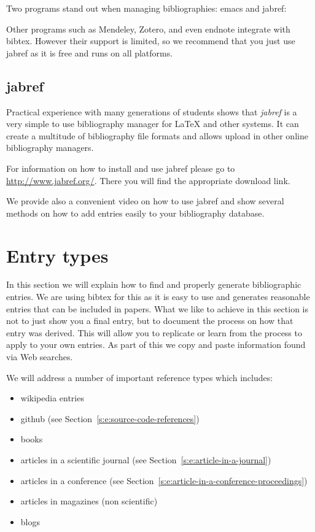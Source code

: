 Two programs stand out when managing bibliographies: emacs and jabref:


Other programs such as Mendeley, Zotero, and even endnote integrate with
bibtex. However their support is limited, so we recommend that you just
use jabref as it is free and runs on all platforms.

\subsection{jabref}\label{jabref}


Practical experience with many generations of students shows that
\textit{jabref} is a very simple to use bibliography manager for LaTeX and
other systems. It can create a multitude of bibliography file formats
and allows upload in other online bibliography managers.

For information on how to install and use jabref please go to 
\url{http://www.jabref.org/}. There you will find the appropriate
download link.

We provide also a convenient video on how to use jabref and show
several methods on how to add entries easily to your bibliography database.




\section{Entry types}

In this section we will explain how to find and properly generate
bibliographic entries. We are using bibtex for this as it is easy to
use and generates reasonable entries that can be included in
papers. What we like to achieve in this section is not to just show
you a final entry, but to document the process on how that entry was
derived. This will allow you to replicate or learn from the process to
apply to your own entries. As part of this we copy and paste
information found via Web searches.

We will address a number of important reference types which includes:

\begin{itemize}

\item
  wikipedia entries
\item
  github (see Section~\ref{s:e:source-code-references})
\item
  books
\item
  articles in a scientific journal (see Section~\ref{s:e:article-in-a-journal})
\item
  articles in a conference (see Section~\ref{s:e:article-in-a-conference-proceedings})
\item
  articles in magazines (non scientific)
\item
  blogs
\end{itemize}

